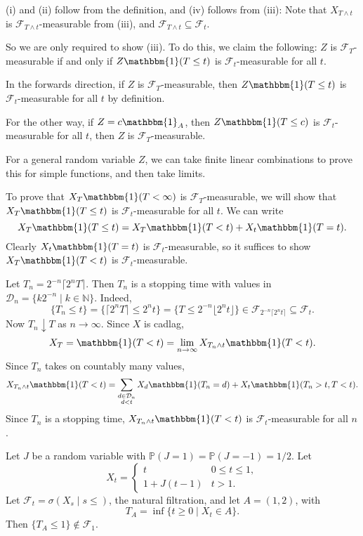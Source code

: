 \documentclass[12pt]{article}
\begin{document}
\begin{proofbox}
	

	(i) and (ii) follow from the definition, and (iv) follows from (iii): Note that $X_{T \wedge t}$ is $\mathcal{F}_{T \wedge t}$-measurable from (iii), and $\mathcal{F}_{T \wedge t} \subseteq \mathcal{F}_t$.

	So we are only required to show (iii). To do this, we claim the following: $Z$ is $\mathcal{F}_T$-measurable if and only if $Z \mathbbm{1}(T \leq t)$ is $\mathcal{F}_t$-measurable for all $t$.

	In the forwards direction, if $Z$ is $\mathcal{F}_T$-measurable, then $Z \mathbbm{1}(T \leq t)$ is $\mathcal{F}_t$-measurable for all $t$ by definition.

	For the other way, if $Z = c \mathbbm{1}_{A}$, then $Z \mathbbm{1}(T \leq c)$ is $\mathcal{F}_t$-measurable for all $t$, then $Z$ is $\mathcal{F}_T$-measurable.

	For a general random variable $Z$, we can take finite linear combinations to prove this for simple functions, and then take limits.

	To prove that $X_T \mathbbm{1}(T < \infty)$ is $\mathcal{F}_T$-measurable, we will show that $X_T \mathbbm{1}(T \leq t)$ is $\mathcal{F}_t$-measurable for all $t$. We can write
	\[
	X_T \mathbbm{1}(T \leq t) = X_T \mathbbm{1}(T < t) + X_t \mathbbm{1}(T = t).
	\]
	Clearly $X_t \mathbbm{1}(T = t)$ is $\mathcal{F}_t$-measurable, so it suffices to show $X_T \mathbbm{1}(T < t)$ is $\mathcal{F}_t$-measurable.

	Let $T_n = 2^{-n} \lceil 2^{n} T \rceil$. Then $T_n$ is a stopping time with values in $\mathcal{D}_n = \{ k2^{-n} \mid k \in \mathbb{N}\}$. Indeed,
	\[
		\{ T_n \leq t\} = \{ \lceil 2^{n} T \rceil \leq 2^{n} t \} = \{ T \leq 2^{-n} \lfloor 2^{n} t \rfloor\} \in \mathcal{F}_{2^{-n} \lceil 2^{n} t \rceil} \subseteq \mathcal{F}_t.
	\]
	Now $T_n \downarrow T$ as $n \to \infty$. Since $X$ is cadlag,
	\[
	X_T = \mathbbm{1}(T < t) = \lim_{n \to \infty} X_{T_n \wedge t} \mathbbm{1}(T < t).
	\]
	Since $T_n$ takes on countably many values,
	\[
	X_{T_n \wedge t} \mathbbm{1}(T < t) = \sum_{\substack{d \in \mathcal{D}_n \\ d < t}} X_d \mathbbm{1}(T_n = d) + X_t \mathbbm{1}(T_n > t, T < t).
	\]
	Since $T_n$ is a stopping time, $X_{T_n \wedge t}\mathbbm{1}(T < t)$ is $\mathcal{F}_t$-measurable for all $n$.
\end{proofbox}

\begin{exbox}
	Let $J$ be a random variable with $\mathbb{P}(J = 1) = \mathbb{P}(J = -1) = 1/2$. Let
	\[
	X_t =
	\begin{cases}
		t & 0 \leq t \leq 1, \\
		1 + J(t - 1) & t > 1.
	\end{cases}
	\]
	Let $\mathcal{F}_t = \sigma(X_s \mid s \leq )$, the natural filtration, and let $A = (1, 2)$, with
	\[
		T_A = \inf \{t \geq 0 \mid X_t \in A\}.
	\]
	Then $\{T_A \leq 1\} \not \in \mathcal{F}_1$.
\end{exbox}
\end{document}
